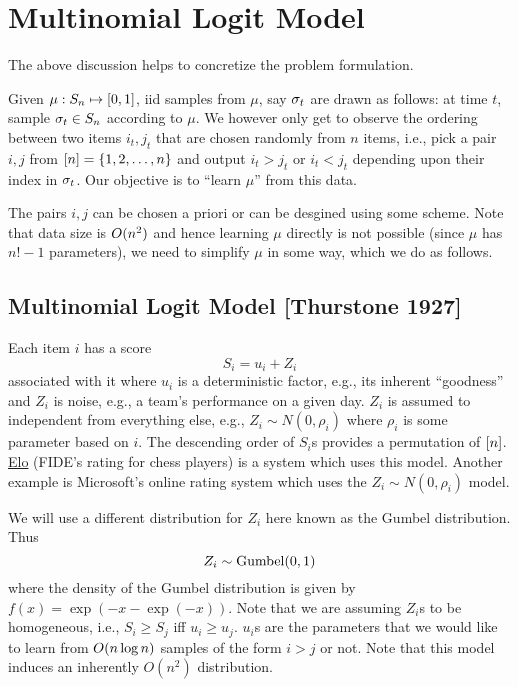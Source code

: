 \documentclass[letterpaper, 10pt]{amsart}
\begin{document}

\section{Multinomial Logit Model}

The above discussion helps to concretize the problem formulation.

\begin{problem}
Given $\mu: S_n \mapsto [0,1]$, iid samples from $\mu$, say $\sigma_t$ are drawn as follows: at time $t$, sample $\sigma_t \in S_n$ according to $\mu$. We however only get to observe the ordering between two items $i_t, j_t$ that are chosen randomly from $n$ items, i.e., pick a pair $i, j$ from $[n] = \{1, 2, \ldots, n\}$ and output $i_t > j_t$ or $i_t < j_t$ depending upon their index in $\sigma_t$. Our objective is to ``learn $\mu$'' from this data.
\end{problem}

The pairs $i, j$ can be chosen a priori or can be desgined using some scheme. Note that data size is $O(n^2)$ and hence learning $\mu$ directly is not possible (since $\mu$ has $n!-1$ parameters), we need to simplify $\mu$ in some way, which we do as follows.

\subsection{Multinomial Logit Model [Thurstone 1927]}

Each item $i$ has a score
$$S_i = u_i + Z_i$$
associated with it where $u_i$ is a deterministic factor, e.g., its inherent ``goodness'' and $Z_i$ is noise, e.g., a team's performance on a given day. $Z_i$ is assumed to independent from everything else, e.g., $Z_i \sim N(0, \rho_i)$ where $\rho_i$ is some parameter based on $i$. The descending order of $S_i$s provides a permutation of $[n]$. \href{http://www.2700chess.com}{Elo} (FIDE's rating for chess players) is a system which uses this model. Another example is Microsoft's online rating system which uses the $Z_i \sim N(0, \rho_i)$ model.

We will use a different distribution for $Z_i$ here known as the Gumbel distribution. Thus
$$Z_i \sim \textrm{Gumbel}(0,1)$$
where the density of the Gumbel distribution is given by $f(x) = \exp(-x -\exp(-x))$. Note that we are assuming $Z_i$s to be homogeneous, i.e., $S_i \geq S_j$ iff $u_i \geq u_j$. $u_i$s are the parameters that we would like to learn from $O(n \log n)$ samples of the form $i > j$ or not. Note that this model induces an inherently $O(n^2)$ distribution.
\end{document}
